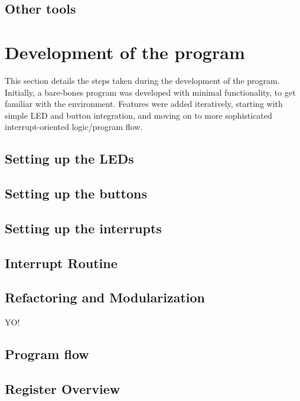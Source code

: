     \subsection{Other tools}

        

\section{Development of the program}

This section details the steps taken during the development of the program.
Initially, a bare-bones program was developed with minimal functionality, to get familiar with the environment.
Features were added iteratively, starting with simple LED and button integration, and moving on to more sophisticated interrupt-oriented logic/program flow.

    \subsection{Setting up the LEDs}
        
        

    \subsection{Setting up the buttons}

        

    \subsection{Setting up the interrupts}

        

    \subsection{Interrupt Routine}
        

    \subsection{Refactoring and Modularization}

        YO!

    \subsection{Program flow}

        

    \subsection{Register Overview}

        

